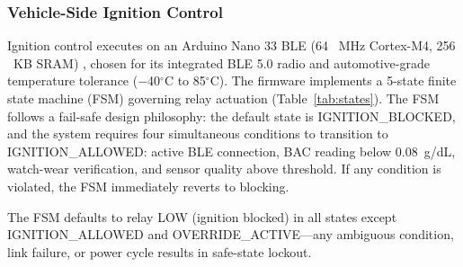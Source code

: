 \documentclass[HARVARD,Times2COL]{WileyNJDv5} %
\providecommand{\DIFadd}[1]{{\protect\color{red} #1}} %
\providecommand{\DIFdel}[1]{} %
\providecommand{\DIFaddbegin}{} %
\providecommand{\DIFaddend}{} %
\providecommand{\DIFdelbegin}{} %
\providecommand{\DIFdelend}{} %
\providecommand{\DIFscaledelfig}{0.5}
\newlength{\DIFdelgraphicswidth} %
\newlength{\DIFdelgraphicsheight} %
\providecommand{\DIFaddincludegraphics}[2][]{{\color{blue}\fbox{\DIFOincludegraphics[#1]{#2}}}} %
\providecommand{\DIFdelincludegraphics}[2][]{%
\sbox{\DIFdelgraphicsbox}{\DIFOincludegraphics[#1]{#2}}%
\settoboxwidth{\DIFdelgraphicswidth}{\DIFdelgraphicsbox} %
\settoboxtotalheight{\DIFdelgraphicsheight}{\DIFdelgraphicsbox} %
\scalebox{\DIFscaledelfig}{%
\parbox[b]{\DIFdelgraphicswidth}{\usebox{\DIFdelgraphicsbox}\\[-\baselineskip] \rule{\DIFdelgraphicswidth}{0em}}\llap{\resizebox{\DIFdelgraphicswidth}{\DIFdelgraphicsheight}{%
\setlength{\unitlength}{\DIFdelgraphicswidth}%
\begin{picture}(1,1)%
\thicklines\linethickness{2pt} %
{\color[rgb]{1,0,0}\put(0,0){\framebox(1,1){}}}%
{\color[rgb]{1,0,0}\put(0,0){\line( 1,1){1}}}%
{\color[rgb]{1,0,0}\put(0,1){\line(1,-1){1}}}%
\end{picture}%
}\hspace*{3pt}}} %
} %
\DeclareRobustCommand{\DIFaddbegin}{\DIFOaddbegin \let\includegraphics\DIFaddincludegraphics} %
\DeclareRobustCommand{\DIFaddend}{\DIFOaddend \let\includegraphics\DIFOincludegraphics} %
\DeclareRobustCommand{\DIFdelbegin}{\DIFOdelbegin \let\includegraphics\DIFdelincludegraphics} %
\DeclareRobustCommand{\DIFdelend}{\DIFOaddend \let\includegraphics\DIFOincludegraphics} %
\begin{document}
\subsubsection{\DIFadd{Vehicle-Side Ignition Control}}
\DIFaddend Ignition control executes on an Arduino Nano 33 BLE (64\DIFaddbegin \DIFadd{~}\DIFaddend MHz Cortex-M4, 256\DIFaddbegin \DIFadd{~}\DIFaddend KB SRAM)\DIFdelbegin \DIFdel{. A }\DIFdelend \DIFaddbegin \DIFadd{, chosen for its integrated BLE 5.0 radio and automotive-grade temperature tolerance ($-$40$^\circ$C to 85$^\circ$C). The firmware implements a }\DIFaddend 5-state \DIFdelbegin \DIFdel{FSM governs }\DIFdelend \DIFaddbegin \DIFadd{finite state machine (FSM) governing }\DIFaddend relay actuation (Table~\ref{tab:states}). \DIFaddbegin \DIFadd{The FSM follows a fail-safe design philosophy: the default state is IGNITION\_BLOCKED, and the system requires four simultaneous conditions to transition to IGNITION\_ALLOWED: active BLE connection, BAC reading below 0.08~g/dL, watch-wear verification, and sensor quality above threshold. If any condition is violated, the FSM immediately reverts to blocking.
}\DIFaddend \begin{table}[htbp]
\caption{Ignition Control State Machine}
\label{tab:states}
\centering
{}
\end{table}

The FSM defaults to relay LOW (ignition blocked) in all states except IGNITION\_ALLOWED and OVERRIDE\_ACTIVE---any ambiguous condition, link failure, or power cycle results in safe-state lockout.
\end{document}
